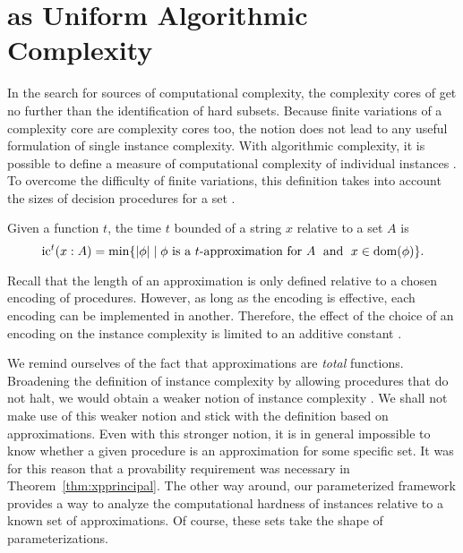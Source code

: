 \section{as Uniform Algorithmic Complexity}

In the search for sources of computational complexity, the complexity cores of \citeauthor{lynch1975reducibility} get no further than the identification of hard subsets.
Because finite variations of a complexity core are complexity cores too, the notion does not lead to any useful formulation of single instance complexity.
With algorithmic complexity, it is possible to define a measure of computational complexity of individual instances \parencite{li2008introduction}.
To overcome the difficulty of finite variations, this definition takes into account the sizes of decision procedures for a set \parencite{orponen1994instance}.
\begin{definition}
  Given a function $t$, the time $t$ bounded  of a string $x$ relative to a set $A$ is
  \begin{equation*}
    \operatorname{ic}^t(x : A) = \min\{{\lvert\phi\rvert} \;{|}\; \text{$\phi$ is a $t$-approximation for $A$} \;\text{ and }\; x \in \operatorname{dom}(\phi)\}.
  \end{equation*}
\end{definition}

Recall that the length of an approximation is only defined relative to a chosen encoding of procedures.
However, as long as the encoding is effective, each encoding can be implemented in another.
Therefore, the effect of the choice of an encoding on the instance complexity is limited to an additive constant \parencite{orponen1994instance,li2008introduction}.

We remind ourselves of the fact that approximations are \emph{total} functions.
Broadening the definition of instance complexity by allowing procedures that do not halt, we would obtain a weaker notion of instance complexity \parencite{kummer1996kolmogorov}.
We shall not make use of this weaker notion and stick with the definition based on approximations.
Even with this stronger notion, it is in general impossible to know whether a given procedure is an approximation for some specific set.
It was for this reason that a provability requirement was necessary in Theorem~\ref{thm:xpprincipal}.
The other way around, our parameterized framework provides a way to analyze the computational hardness of instances relative to a known set of approximations.
Of course, these sets take the shape of parameterizations.

